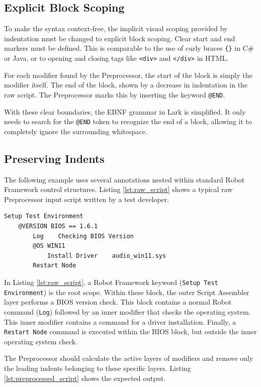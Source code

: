 \subsection{Explicit Block Scoping}


To make the syntax context-free, the implicit visual scoping provided by indentation must be changed to explicit block scoping. Clear start and end markers must be defined. This is comparable to the use of curly braces \texttt{\{\}} in C\# or Java, or to opening and closing tags like \texttt{<div>} and \texttt{</div>} in HTML.


For each modifier found by the Preprocessor, the start of the block is simply the modifier itself. The end of the block, shown by a decrease in indentation in the raw script. The Preprocessor marks this by inserting the keyword \texttt{@END}.


With these clear boundaries, the EBNF grammar in Lark is simplified. It only needs to search for the \texttt{@END} token to recognize the end of a block, allowing it to completely ignore the surrounding whitespace.


\subsection{Preserving Indents}


The following example uses several annotations nested within standard Robot Framework control structures. Listing \ref{lst:raw_script} shows a typical raw Preprocessor input script written by a test developer.


\begin{lstlisting}[caption={Raw input script with nested modifiers}, label={lst:raw_script}]
Setup Test Environment
    @VERSION BIOS == 1.6.1
        Log    Checking BIOS Version
        @OS WIN11
            Install Driver    audio_win11.sys
        Restart Node
\end{lstlisting}


In Listing \ref{lst:raw_script}, a Robot Framework keyword (\texttt{Setup Test Environment}) is the root scope. Within these block, the outer Script Assembler layer performs a BIOS version check. This block contains a normal Robot command (\texttt{Log}) followed by an inner modifier that checks the operating system. This inner modifier contains a command for a driver installation. Finally, a \texttt{Restart Node} command is executed within the BIOS block, but outside the inner operating system check.


The Preprocessor should calculate the active layers of modifiers and remove only the leading indents belonging to these specific layers. Listing \ref{lst:preprocessed_script} shows the expected output.



